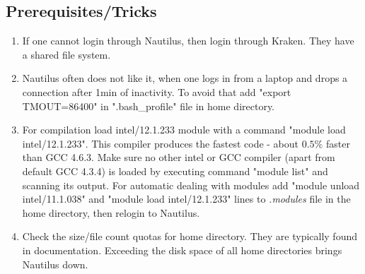 \documentclass{emulateapj}
\begin{document}
\subsection{Prerequisites/Tricks}
\begin{enumerate}
\item{If one cannot login through Nautilus, then login through
  Kraken. They have a shared file system.}
\item{Nautilus often does not like it, when one logs in from a laptop
  and drops a connection after 1min of inactivity.  To avoid that add
  "export TMOUT=86400" in ".bash\_profile" file in home directory.}
\item{For compilation load intel/12.1.233 module with a command
  "module load intel/12.1.233". This compiler produces the fastest
  code - about $0.5\%$ faster than GCC 4.6.3.  Make sure no other
  intel or GCC compiler (apart from default GCC 4.3.4) is loaded by
  executing command "module list" and scanning its output.  For
  automatic dealing with modules add "module unload intel/11.1.038"
  and "module load intel/12.1.233" lines to \textit{.modules} file in
  the home directory, then relogin to Nautilus.}
\item{Check the size/file count quotas for home directory. They are
  typically found in documentation. Exceeding the disk space of all
  home directories brings Nautilus down.}
\end{enumerate}
\end{document}
